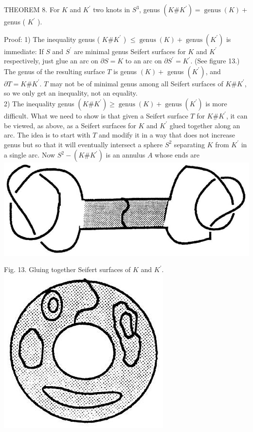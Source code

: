 \documentclass[10pt, letterpaper]{article}
\begin{document}
THEOREM 8. For $K$ and $K^{\prime}$ two knots in $S^{3}$, genus $\left(K \# K^{\prime}\right)=\operatorname{genus}(K)+$ genus ( $K^{\prime}$ ).

Proof: 1) The inequality genus ( $K \# K^{\prime}$ ) $\leq \operatorname{genus}(K)+\operatorname{genus}\left(K^{\prime}\right)$ is immediate: If $S$ and $S^{\prime}$ are minimal genus Seifert surfaces for $K$ and $K^{\prime}$ respectively, just glue an arc on $\partial S=K$ to an arc on $\partial S^{\prime}=K^{\prime}$. (See figure 13.) The genus of the resulting surface $T$ is genus $(K)+$ genus $\left(K^{\prime}\right)$, and $\partial T=K \# K^{\prime}$. $T$ may not be of minimal genus among all Seifert surfaces of $K \# K^{\prime}$, so we only get an inequality, not an equality.\\
2) The inequality genus $\left(K \# K^{\prime}\right) \geq \operatorname{genus}(K)+\operatorname{genus}\left(K^{\prime}\right)$ is more difficult. What we need to show is that given a Seifert surface $T$ for $K \# K^{\prime}$, it can be viewed, as above, as a Seifert surfaces for $K$ and $K^{\prime}$ glued together along an arc. The idea is to start with $T$ and modify it in a way that does not increase genus but so that it will eventually intersect a sphere $S^{2}$ separating $K$ from $K^{\prime}$ in a single arc. Now $S^{2}-\left(K \# K^{\prime}\right)$ is an annulus $A$ whose ends are\\
\includegraphics[scale=0.2, center]{2025_05_21_037de704f595ce642d3eg-085(1)}

Fig. 13. Gluing together Seifert surfaces of $K$ and $K^{\prime}$.\\
\includegraphics[scale=0.2, center]{2025_05_21_037de704f595ce642d3eg-085}
\end{document}
